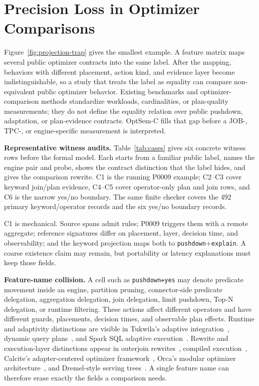 \section{Precision Loss in Optimizer Comparisons}
\label{sec:problem}
Figure~\ref{fig:projection-trap} gives the smallest example.  A feature matrix maps several public optimizer contracts into the same label.  After the mapping, behaviors with different placement, action kind, and evidence layer become indistinguishable, so a study that treats the label as equality can compare non-equivalent public optimizer behavior.  Existing benchmarks and optimizer-comparison methods standardize workloads, cardinalities, or plan-quality measurements; they do not define the equality relation over public pushdown, adaptation, or plan-evidence contracts.  OptSem-C fills that gap before a JOB-, TPC-, or engine-specific measurement is interpreted.



\textbf{Representative witness audits.}  Table~\ref{tab:cases} gives six concrete witness rows before the formal model.  Each starts from a familiar public label, names the engine pair and probe, shows the contract distinction that the label hides, and gives the comparison rewrite.  C1 is the running P0009 example; C2--C3 cover keyword join/plan evidence, C4--C5 cover operator-only plan and join rows, and C6 is the narrow yes/no boundary.  The same finite checker covers the 492 primary keyword/operator records and the six yes/no boundary records.



C1 is mechanical.  Source spans admit rules; P0009 triggers them with a remote aggregate; reference signatures differ on placement, layer, decision time, and observability; and the keyword projection maps both to \texttt{pushdown}+\texttt{explain}.  A coarse existence claim may remain, but portability or latency explanations must keep those fields.

\textbf{Feature-name collision.} A cell such as \texttt{pushdown=yes} may denote predicate movement inside an engine, partition pruning, connector-side predicate delegation, aggregation delegation, join delegation, limit pushdown, Top-N delegation, or runtime filtering.  These actions affect different operators and have different guards, placements, decision times, and observable plan effects.  Runtime and adaptivity distinctions are visible in Tukwila's adaptive integration~\cite{ives1999tukwila}, dynamic query plans~\cite{cole1994optimization}, and Spark SQL adaptive execution~\cite{armbrust2015spark}.  Rewrite and execution-layer distinctions appear in outerjoin rewrites~\cite{galindo1997outerjoin}, compiled execution~\cite{neumann2011efficient}, Calcite's adapter-centered optimizer framework~\cite{begoli2018calcite}, Orca's modular optimizer architecture~\cite{soliman2014orca}, and Dremel-style serving trees~\cite{melnik2010dremel}.  A single feature name can therefore erase exactly the fields a comparison needs.

